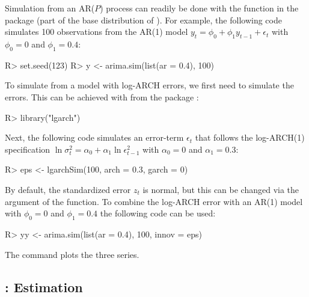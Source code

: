 \documentclass[article,nojss]{jss}
\begin{document}
Simulation from an AR($P$) process can readily be done with the  function in the  package (part of the base distribution of ). For example, the following code simulates 100 observations from the AR(1) model $y_t = \phi_0 + \phi_1 y_{t-1} + \epsilon_t$ with $\phi_0=0$ and $\phi_1=0.4$:
%
\begin{CodeChunk}
\begin{CodeInput}
R> set.seed(123)
R> y <- arima.sim(list(ar = 0.4), 100)
\end{CodeInput}
\end{CodeChunk}
% 
To simulate from a model with log-ARCH errors, we first need to simulate the errors. This can be achieved with  from the  package \citep{Sucarrat2015lgarchV06}:
%
\begin{CodeChunk}
\begin{CodeInput}
R> library("lgarch")
\end{CodeInput}
\end{CodeChunk}
%
Next, the following code simulates an error-term $\epsilon_t$ that follows the log-ARCH(1) specification $\ln\sigma_t^2 = \alpha_0 + \alpha_1 \ln\epsilon_{t-1}^2$ with $\alpha_0=0$ and $\alpha_1=0.3$:
%
\begin{CodeChunk}
\begin{CodeInput}
R> eps <- lgarchSim(100, arch = 0.3, garch = 0)
\end{CodeInput}
\end{CodeChunk}
%
By default, the standardized error $z_t$ is normal, but this can be changed via the  argument of the  function. To combine the log-ARCH error with an AR(1) model with $\phi_0=0$ and $\phi_1=0.4$ the following code can be used:
%
\begin{CodeChunk}
\begin{CodeInput}
R> yy <- arima.sim(list(ar = 0.4), 100, innov = eps)
\end{CodeInput}
\end{CodeChunk}
% 
The command  plots the three series.

\subsection[arx:Estimation]{: Estimation}
\label{subsec:arx:estimation}
\end{document}

